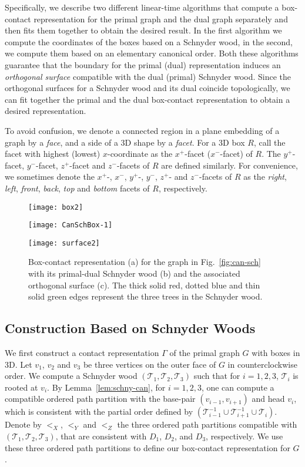 \documentclass{article}
\newcommand{\TT}{{\mathcal{T}}}
\newcommand{\df}{\textit}
\begin{document}
Specifically, we describe two different linear-time algorithms that compute
 a box-contact representation for the primal graph and the dual graph separately
 and then fits them together to obtain the desired result.
In the first algorithm we compute the coordinates of the boxes based on a Schnyder wood,
 in the second, we compute them based on an elementary canonical order. Both these algorithms
 guarantee that the boundary for the primal (dual) representation induces an \df{orthogonal surface}
 compatible with the dual (primal) Schnyder wood.
Since the orthogonal surfaces for a Schnyder wood and its dual coincide topologically, we can
fit together the primal and the dual box-contact representation to obtain a desired representation.




To avoid confusion, we denote a connected region in a plane embedding of a graph
 by a \df{face}, and a side of a 3D shape by a \df{facet}. For a 3D box $R$,
 call the facet with highest (lowest) $x$-coordinate as the $x^+$-facet ($x^-$-facet) of $R$.
The $y^+$-facet, $y^-$-facet, $z^+$-facet and $z^-$-facets of $R$ are defined similarly. For
 convenience, we sometimes denote the $x^+$-, $x^-$, $y^+$-, $y^-$, $z^+$- and $z^-$-facets
 of $R$ as the \df{right}, \df{left}, \df{front}, \df{back}, \df{top} and \df{bottom} facets of $R$, respectively.





\begin{figure}[tb]
\centering
\parbox[t][4.5cm][t]{0.07\textwidth}
{
	\texttt{[image: box2]}
}
\parbox[t][4.5cm][b]{0.62\textwidth}
{
	\texttt{[image: CanSchBox-1]}
}
\parbox[t][4.5cm][t]{0.28\textwidth}
{
	\texttt{[image: surface2]}
}
    \caption{Box-contact representation (a) for the graph in Fig.~\ref{fig:can-sch}
	with its primal-dual Schnyder wood (b) and the associated orthogonal surface (c).
	The thick solid red, dotted blue and thin solid green edges represent the three trees
	in the Schnyder wood.}
    \label{fig:draw}
\end{figure}


\subsection{Construction Based on Schnyder Woods}
\label{sec:mainproof}

We first construct a contact representation $\Gamma$ of the primal graph $G$ with boxes in 3D.
 Let $v_1$, $v_2$ and $v_3$ be three vertices on the outer face of $G$ in counterclockwise order.
 We compute a Schnyder wood $(\TT_1, \TT_2, \TT_3)$ such that for $i=1,2,3$, $\TT_i$ is rooted
 at $v_i$. By Lemma~\ref{lem:schny-can}, for $i=1,2,3$, one can compute a compatible ordered path
 partition with the base-pair $(v_{i-1}, v_{i+1})$ and head $v_i$, which is consistent with the partial order
 defined by $(\TT_{i-1}^{-1}\cup \TT_{i+1}^{-1}\cup \TT_{i})$. Denote by
 $<_X$, $<_Y$ and $<_Z$ the three ordered path partitions compatible with $(\TT_1, \TT_2, \TT_3)$, that
 are consistent with $D_1$, $D_2$, and $D_3$, respectively. We use these three ordered path partitions
 to define our box-contact representation for $G$.
\end{document}
